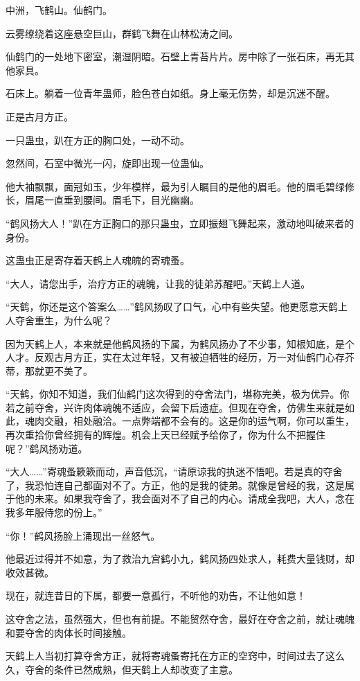 \begin{this_body}
中洲，飞鹤山。仙鹤门。

云雾缭绕着这座悬空巨山，群鹤飞舞在山林松涛之间。

仙鹤门的一处地下密室，潮湿阴暗。石壁上青苔片片。房中除了一张石床，再无其他家具。

石床上。躺着一位青年蛊师，脸色苍白如纸。身上毫无伤势，却是沉迷不醒。

正是古月方正。

一只蛊虫，趴在方正的胸口处，一动不动。

忽然间，石室中微光一闪，旋即出现一位蛊仙。

他大袖飘飘，面冠如玉，少年模样，最为引人瞩目的是他的眉毛。他的眉毛碧绿修长，眉尾一直垂到腰间。眉毛下，目光幽幽。

“鹤风扬大人！”趴在方正胸口的那只蛊虫，立即振翅飞舞起来，激动地叫破来者的身份。

这蛊虫正是寄存着天鹤上人魂魄的寄魂蚤。

“大人，请您出手，治疗方正的魂魄，让我的徒弟苏醒吧。”天鹤上人道。

“天鹤，你还是这个答案么……”鹤风扬叹了口气，心中有些失望。他更愿意天鹤上人夺舍重生，为什么呢？

因为天鹤上人，本来就是他鹤风扬的下属，为鹤风扬办了不少事，知根知底，是个人才。反观古月方正，实在太过年轻，又有被迫牺牲的经历，万一对仙鹤门心存芥蒂，那就更不美了。

“天鹤，你知不知道，我们仙鹤门这次得到的夺舍法门，堪称完美，极为优异。你若之前夺舍，兴许肉体魂魄不适应，会留下后遗症。但现在夺舍，仿佛生来就是如此，魂肉交融，相处融洽。一点弊端都不会有的。这是你的运气啊，你可以重生，再次重拾你曾经拥有的辉煌。机会上天已经赋予给你了，你为什么不把握住呢？”鹤风扬劝道。

“大人……”寄魂蚤簌簌而动，声音低沉，“请原谅我的执迷不悟吧。若是真的夺舍了，我恐怕连自己都面对不了。方正，他的是我的徒弟。就像是曾经的我，这是属于他的未来。如果我夺舍了，我会面对不了自己的内心。请成全我吧，大人，念在我多年服侍您的份上。”

“你！”鹤风扬脸上涌现出一丝怒气。

他最近过得并不如意，为了救治九宫鹤小九，鹤风扬四处求人，耗费大量钱财，却收效甚微。

现在，就连昔日的下属，都要一意孤行，不听他的劝告，不让他如意！

这夺舍之法，虽然强大，但也有前提。不能贸然夺舍，最好在夺舍之前，就让魂魄和要夺舍的肉体长时间接触。

天鹤上人当初打算夺舍方正，就将寄魂蚤寄托在方正的空窍中，时间过去了这么久，夺舍的条件已然成熟，但天鹤上人却改变了主意。


\end{this_body}

